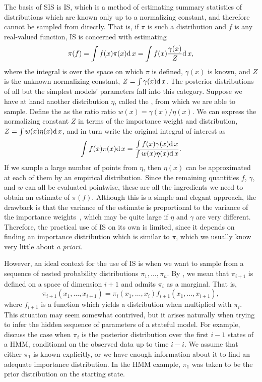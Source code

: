 The basis of \gls{SIS} is \gls{IS}, which is a method of estimating summary
statistics of distributions which are known only up to a normalizing constant,
and therefore cannot be sampled from directly. That is, if $\pi$ is such a
distribution and $f$ is any real-valued function, \gls{IS} is concerned with
estimating
\[
  \pi(f) = \int f(x)\pi(x)\mathrm{d}\, x = \int f(x) \frac{\gamma(x)}{Z} \mathrm{d}\, x,
\]
where the integral is over the space on which $\pi$ is defined, $\gamma(x)$ is
known, and $Z$ is the unknown normalizing constant, $Z = \int \gamma(x) \mathrm{d}\, x$.
The posterior distributions of all but the simplest models' parameters fall
into this category. Suppose we have at hand another distribution $\eta$, called
the , from which we are able to sample. Define
the  as the ratio ratio $w(x) = \gamma(x)/\eta(x)$. We
can express the normalizing constant $Z$ in terms of the importance weight and
distribution, $Z = \int w(x) \eta(x) \mathrm{d}\, x$, and in turn write the original
integral of interest as
\[
  \int f(x) \pi(x) \mathrm{d}\, x = \frac{\int f(x) \gamma(x) \mathrm{d}\, x}
                               {\int w(x) \eta(x) \mathrm{d}\, x}.
\]
If we sample a large number of points from $\eta$, then $\eta(x)$ can be
approximated at each of them by an empirical distribution. Since the remaining
quantities $f$, $\gamma$, and $w$ can all be evaluated pointwise, these are all
the ingredients we need to obtain an estimate of $\pi(f)$. Although this is a
simple and elegant approach, the drawback is that the variance of the estimate
is proportional to the variance of the importance
weights~\autocite{liu2008monte}, which may be quite large if $\eta$ and
$\gamma$ are very different. Therefore, the practical use of \gls{IS} on its
own is limited, since it depends on finding an importance distribution which is
similar to $\pi$, which we usually know very little about \textit{a priori}.

However, an ideal context for the use of \gls{IS} is when we want to sample
from a sequence of nested probability distributions $\pi_1, \ldots, \pi_n$.
By , we mean that $\pi_{i+1}$ is defined on a space of dimension
$i+1$ and admits $\pi_i$ as a marginal. That is,
\[
  \pi_{i+1}(x_1, \ldots, x_{i+1}) = \pi_i(x_1, \ldots, x_i) f_{i+1}(x_1, \ldots, x_{i+1}),
\]
where $f_{i+1}$ is a function which yields a distribution when multiplied with
$\pi_i$. This situation may seem somewhat contrived, but it arises naturally
when trying to infer the hidden sequence of parameters of a stateful model. For
example, \textcite{doucet2001introduction} discuss the case when $\pi_i$ is the
posterior distribution over the first $i-1$ states of a \gls{HMM}, conditional
on the observed data up to time $i-i$. We assume that either $\pi_1$ is known
explicitly, or we have enough information about it to find an adequate
importance distribution. In the \gls{HMM} example, $\pi_1$ was taken to be the
prior distribution on the starting state.

